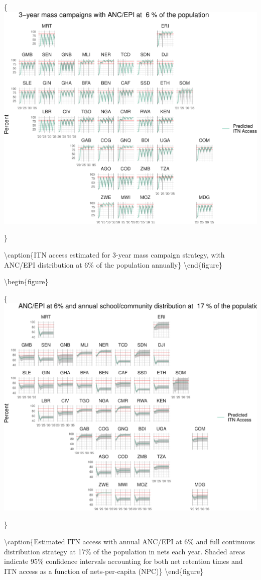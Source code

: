 \documentclass[review,
3p]{elsarticle} %
\begin{document}
\{\centering \includegraphics[width=0.8\linewidth]{quant_paper_files/figure-latex/geo_facets_3ucc-1}

\}

\textbackslash caption\{\label{geo_facets_3ucc}ITN access estimated for
3-year mass campaign strategy, with ANC/EPI distribution at 6\% of the
population annually\}\label{fig:geo_facets_3ucc}
\textbackslash end\{figure\}

\textbackslash begin\{figure\}

\{\centering \includegraphics[width=0.8\linewidth]{quant_paper_files/figure-latex/geo_facets_cd-1}

\}

\textbackslash caption\{\label{geo_facets_cd}Estimated ITN access with
annual ANC/EPI at 6\% and full continuous distribution strategy at 17\%
of the population in nets each year. Shaded areas indicate 95\%
confidence intervals accounting for both net retention times and ITN
access as a function of nets-per-capita (NPC)\}\label{fig:geo_facets_cd}
\textbackslash end\{figure\}
\end{document}
